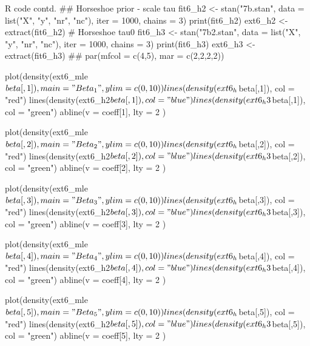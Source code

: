 \documentclass{article}
\begin{document}
\begin{sexylisting}{R code contd.}
## Horseshoe prior - scale tau
fit6_h2 <- stan("7b.stan", data = list("X", "y", "nr", "nc"), 
                iter = 1000, chains = 3)
print(fit6_h2)
ext6_h2 <- extract(fit6_h2)
# Horseshoe tau0
fit6_h3 <- stan("7b2.stan", data = list("X", "y", "nr", "nc"), 
                iter = 1000, chains = 3)
print(fit6_h3)
ext6_h3 <- extract(fit6_h3)
##
par(mfcol = c(4,5), mar = c(2,2,2,2))

plot(density(ext6_mle$beta[,1]), main = "Beta_1", ylim = c(0,10))
lines(density(ext6_h$beta[,1]), col = "red")
lines(density(ext6_h2$beta[,1]), col = "blue")
lines(density(ext6_h3$beta[,1]), col = "green")
abline(v = coeff[1], lty = 2 )

plot(density(ext6_mle$beta[,2]), main = "Beta_2", ylim = c(0,10))
lines(density(ext6_h$beta[,2]), col = "red")
lines(density(ext6_h2$beta[,2]), col = "blue")
lines(density(ext6_h3$beta[,2]), col = "green")
abline(v = coeff[2], lty = 2 )

plot(density(ext6_mle$beta[,3]), main = "Beta_3", ylim = c(0,10))
lines(density(ext6_h$beta[,3]), col = "red")
lines(density(ext6_h2$beta[,3]), col = "blue")
lines(density(ext6_h3$beta[,3]), col = "green")
abline(v = coeff[3], lty = 2 )

plot(density(ext6_mle$beta[,4]), main = "Beta_4", ylim = c(0,10))
lines(density(ext6_h$beta[,4]), col = "red")
lines(density(ext6_h2$beta[,4]), col = "blue")
lines(density(ext6_h3$beta[,4]), col = "green")
abline(v = coeff[4], lty = 2 )

plot(density(ext6_mle$beta[,5]), main = "Beta_5", ylim = c(0,10))
lines(density(ext6_h$beta[,5]), col = "red")
lines(density(ext6_h2$beta[,5]), col = "blue")
lines(density(ext6_h3$beta[,5]), col = "green")
abline(v = coeff[5], lty = 2 )
\end{sexylisting}
\end{document}
